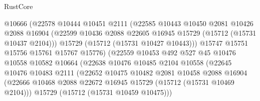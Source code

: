 \begin{lexlean}{RustCore}
\begin{coremodule}
                              @10666
                              (@22578
                                @10444
                                @10451
                                @2111
                                (@22585
                                  @10443
                                  @10450
                                  @2081
                                  @10426
                                  @2088
                                  @16904
                                  (@22599
                                    @10436
                                    @2088
                                    @22605
                                    @16945
                                    @15729
                                    (@15712 (@15731 @10437 @2104)))
                                  @15729
                                  (@15712 (@15731 @10427 @10443)))
                                @15747
                                @15751
                                @15756
                                @15761
                                @15767
                                @15776)
                              (@22559
                                @10453
                                @492
                                @527
                                @45
                                @10476
                                @10558
                                @10582
                                @10664
                                (@22638
                                  @10476
                                  @10485
                                  @2104
                                  @10558
                                  (@22645
                                    @10476
                                    @10483
                                    @2111
                                    (@22652
                                      @10475
                                      @10482
                                      @2081
                                      @10458
                                      @2088
                                      @16904
                                      (@22666
                                        @10468
                                        @2088
                                        @22672
                                        @16945
                                        @15729
                                        (@15712 (@15731 @10469 @2104)))
                                      @15729
                                      (@15712 (@15731 @10459 @10475)))

\end{coremodule}
\end{lexlean}
